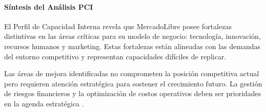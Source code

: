 \paragraph{Síntesis del Análisis PCI}

El Perfil de Capacidad Interna revela que MercadoLibre posee fortalezas distintivas en las áreas críticas para su modelo de negocio: tecnología, innovación, recursos humanos y marketing. Estas fortalezas están alineadas con las demandas del entorno competitivo y representan capacidades difíciles de replicar.

Las áreas de mejora identificadas no comprometen la posición competitiva actual pero requieren atención estratégica para sostener el crecimiento futuro. La gestión de riesgos financieros y la optimización de costos operativos deben ser prioridades en la agenda estratégica \autocite{barney1991, teece2007, grant2016}.
